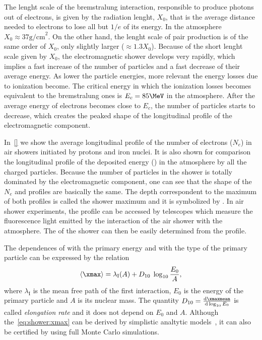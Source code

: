 The lenght scale of the bremstralung interaction, responsible to produce photons out of
electrons, is given by the radiation lenght, $X_0$, that is the average distance needed
to electrons to lose all but $1/e$ of its energy. In the atmosphere $X_0\approx 37\text{g/cm}^2$.
On the other hand, the lenght scale of pair production is of the same order
of $X_0$, only slightly larger ($\approx 1.3 X_0$). Because of the short lenght scale
given by $X_0$, the electromagnetic shower develops very rapidly, which
implies a fast increase of the number of particles and a fast decrease of their
average energy. As lower the particle energies, more relevant the energy losses
due to ionization become. The critical energy in which the ionization losses
becomes equivalent to the bremstralung ones is $E_c = 85 \MeV$ in the
atmosphere. After the average energy of electrons becomes close to $E_c$,
the number of particles starts to decrease, which creates the peaked shape
of the longitudinal profile of the electromagnetic component.

In~\cref{} we show the average longitudinal profile of the number
of electrons ($N_e$) in air showers initiated by protons and iron nuclei.
It is also shown for comparison the longitudinal profile of the
deposited energy (\dEdX) in the atmosphere by all the charged particles.
Because the number of particles in the shower is totally dominated
by the electromagnetic component, one can see that the shape of the
$N_e$ and \dEdX profiles are basically the same.
The depth correspondent to the maximum of both profiles is called
the shower maximum and it is symbolized by \xmax. In air shower
experiments, the \dEdX profile can be accessed by telescopes which
measure the fluorescence light emitted by the interaction of the air shower
with the atmosphere. The \xmax of the shower can then be easily determined
from the \dEdX profile.

The dependences of \xmax with the primary energy and with the type
of the primary particle can be expressed by the relation
\begin{equation}
  \langle\xmax\rangle = \lambda_\text{I}(A)+D_{10}\;\log_{10}\frac{E_0}{A},
  \label{eq:shower:xmax}
\end{equation}
where $\lambda_\text{I}$ is the mean free path of the first interaction,
$E_0$ is the energy of the primary particle and $A$ is its nuclear mass.
The quantity $D_{10} = \frac{ \text{d} \xmaxmean }{ \text{d} \log_{10}E_0 }$
is called \emph{elongation rate} and it does not depend on $E_0$ and $A$.
Although the~\cref{eq:shower:xmax} can be derived by simplistic analtytic models~\cite{Matthews:2005sd},
it can also be certified by using full Monte Carlo simulations.

